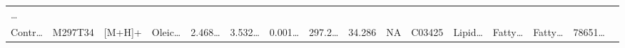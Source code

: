\documentclass[
]{article}
\begin{document}
\begin{longtable}[]{@{}llllllllllllllll@{}}
\begin{minipage}[t]{0.02\columnwidth}
\ldots{}\strut
\end{minipage}\tabularnewline
\begin{minipage}[t]{0.04\columnwidth}\raggedright
Contr\ldots{}\strut
\end{minipage} & \begin{minipage}[t]{0.04\columnwidth}\raggedright
M297T34\strut
\end{minipage} & \begin{minipage}[t]{0.04\columnwidth}\raggedright
{[}M+H{]}+\strut
\end{minipage} & \begin{minipage}[t]{0.04\columnwidth}\raggedright
Oleic\ldots{}\strut
\end{minipage} & \begin{minipage}[t]{0.04\columnwidth}\raggedright
2.468\ldots{}\strut
\end{minipage} & \begin{minipage}[t]{0.04\columnwidth}\raggedright
3.532\ldots{}\strut
\end{minipage} & \begin{minipage}[t]{0.04\columnwidth}\raggedright
0.001\ldots{}\strut
\end{minipage} & \begin{minipage}[t]{0.04\columnwidth}\raggedright
297.2\ldots{}\strut
\end{minipage} & \begin{minipage}[t]{0.04\columnwidth}\raggedright
34.286\strut
\end{minipage} & \begin{minipage}[t]{0.04\columnwidth}\raggedright
NA\strut
\end{minipage} & \begin{minipage}[t]{0.03\columnwidth}\raggedright
C03425\strut
\end{minipage} & \begin{minipage}[t]{0.04\columnwidth}\raggedright
Lipid\ldots{}\strut
\end{minipage} & \begin{minipage}[t]{0.04\columnwidth}\raggedright
Fatty\ldots{}\strut
\end{minipage} & \begin{minipage}[t]{0.04\columnwidth}\raggedright
Fatty\ldots{}\strut
\end{minipage} & \begin{minipage}[t]{0.04\columnwidth}\raggedright
78651\ldots{}\strut
\end{minipage} & \begin{minipage}[t]{0.02\columnwidth}\raggedright

\end{minipage}
\end{longtable}
\end{document}
